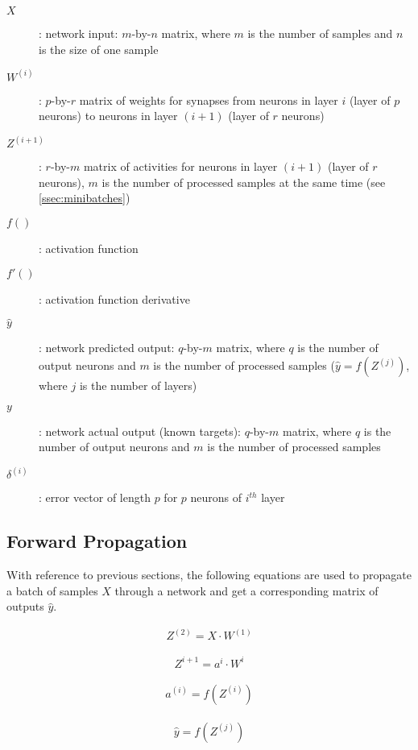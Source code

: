 \begin{description}
\item[$ X $] : network input: $ m $-by-$ n $ matrix, where $ m $ is the number of samples and $ n $ is the size of one sample
\item[$ W^{(i)} $] : $ p $-by-$ r $ matrix of weights for synapses from neurons in layer $ i $ (layer of $ p $ neurons) to neurons in layer $ (i+1) $ (layer of $ r $ neurons)
\item[$ Z^{(i+1)} $] : $ r $-by-$ m $ matrix of activities for neurons in layer $ (i+1) $ (layer of $ r $ neurons), $ m $ is the number of processed samples at the same time (see \cref{ssec:minibatches})
\item[$ f() $] : activation function
\item[$ f'() $] : activation function derivative
\item[$ \hat{y} $] : network predicted output: $ q $-by-$ m $ matrix, where $ q $ is the number of output neurons and $ m $ is the number of processed samples ($ \hat{y} = f(Z^{(j)}) $, where $ j $ is the number of layers)
\item[$ y $] : network actual output (known targets): $ q $-by-$ m $ matrix, where $ q $ is the number of output neurons and $ m $ is the number of processed samples
\item[$ \delta^{(i)} $] : error vector of length $ p $ for $ p $ neurons of $ i^{th} $ layer
\end{description}

\subsection{Forward Propagation} \label{ssec:forward_propagation}
With reference to previous sections, the following equations are used to propagate a batch of samples $ X $ through a network and get a corresponding matrix of outputs $ \hat{y} $.

\begin{align}
Z^{(2)} = X \cdot W^{(1)}
\end{align}

\begin{align}
Z^{i+1} = a^i \cdot W^i
\end{align}

\begin{align}
a^{(i)} = f(Z^{(i)})
\end{align}

\begin{align}
\hat{y} = f(Z^{(j)})
\end{align}

